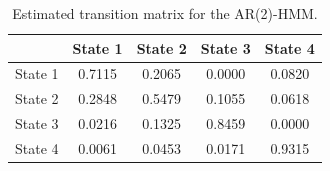 \begin{table}[ht]
\centering
\begin{tabular}{lcccc}
\hline
 & State 1 & State 2 & State 3 & State 4 \\
\hline
State 1 & 0.7115 & 0.2065 & 0.0000 & 0.0820 \\
State 2 & 0.2848 & 0.5479 & 0.1055 & 0.0618 \\
State 3 & 0.0216 & 0.1325 & 0.8459 & 0.0000 \\
State 4 & 0.0061 & 0.0453 & 0.0171 & 0.9315 \\
\hline
\end{tabular}
\caption{Estimated transition matrix for the AR(2)-HMM.}
\label{tab:ar_2_hmm_transition}
\end{table}
